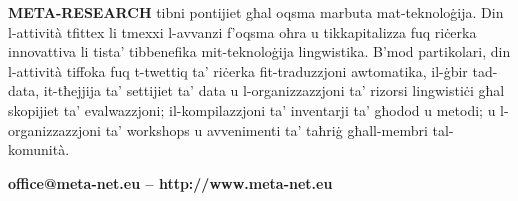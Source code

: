 \begin{multicols}{2}
\textbf{META-RESEARCH} tibni pontijiet għal oqsma marbuta mat-teknoloġija. Din l-attività tfittex li tmexxi l-avvanzi f’oqsma oħra u tikkapitalizza fuq riċerka innovattiva li tista’ tibbenefika mit-teknoloġija lingwistika. B’mod partikolari, din l-attività tiffoka fuq t-twettiq ta’ riċerka fit-traduzzjoni awtomatika, il-ġbir tad-data, it-tħejjija ta’ settijiet ta’ data u l-organizzazzjoni ta’ rizorsi lingwistiċi għal skopijiet ta’ evalwazzjoni; il-kompilazzjoni ta’ inventarji ta’ għodod u metodi; u l-organizzazzjoni ta’ workshops u avvenimenti ta’ taħriġ għall-membri tal-komunità.\\
\centerline{\textbf{office@meta-net.eu -- http://www.meta-net.eu}}
\end{multicols}


\setcounter{section}{0}
\setcounter{figure}{0}

\makeatletter
{}
{
 \renewcommand*{\theHsection}{\thepart.\thesection}
}
\makeatother

\cleardoublepage



